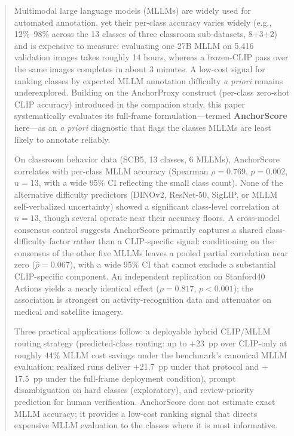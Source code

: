 \documentclass[a4paper,fleqn]{cas-sc}
\begin{document}
\begin{abstract}
Multimodal large language models (MLLMs) are widely used for automated annotation, yet their per-class accuracy varies widely (e.g., 12\%--98\% across the 13 classes of three classroom sub-datasets, 8$+$3$+$2) and is expensive to measure: evaluating one 27B MLLM on 5{,}416 validation images takes roughly 14 hours, whereas a frozen-CLIP pass over the same images completes in about 3 minutes. A low-cost signal for ranking classes by expected MLLM annotation difficulty \emph{a priori} remains underexplored. Building on the AnchorProxy construct (per-class zero-shot CLIP accuracy) introduced in the companion study, this paper systematically evaluates its full-frame formulation---termed \textbf{AnchorScore} here---as an \emph{a priori} diagnostic that flags the classes MLLMs are least likely to annotate reliably.

On classroom behavior data (SCB5, 13 classes, 6 MLLMs), AnchorScore correlates with per-class MLLM accuracy (Spearman $\rho=0.769$, $p=0.002$, $n=13$, with a wide 95\% CI reflecting the small class count). None of the alternative difficulty predictors (DINOv2, ResNet-50, SigLIP, or MLLM self-verbalized uncertainty) showed a significant class-level correlation at $n=13$, though several operate near their accuracy floors. A cross-model consensus control suggests AnchorScore primarily captures a shared class-difficulty factor rather than a CLIP-specific signal: conditioning on the consensus of the other five MLLMs leaves a pooled partial correlation near zero ($\hat{\rho}=0.067$), with a wide 95\% CI that cannot exclude a substantial CLIP-specific component. An independent replication on Stanford40 Actions yields a nearly identical effect ($\rho=0.817$, $p<0.001$); the association is strongest on activity-recognition data and attenuates on medical and satellite imagery.

Three practical applications follow: a deployable hybrid CLIP/MLLM routing strategy (predicted-class routing: up to $+$23~pp over CLIP-only at roughly 44\% MLLM cost savings under the benchmark's canonical MLLM evaluation; realized runs deliver $+$21.7~pp under that protocol and $+$17.5~pp under the full-frame deployment condition), prompt disambiguation on hard classes (exploratory), and review-priority prediction for human verification. AnchorScore does not estimate exact MLLM accuracy; it provides a low-cost ranking signal that directs expensive MLLM evaluation to the classes where it is most informative.
\end{abstract}
\end{document}
